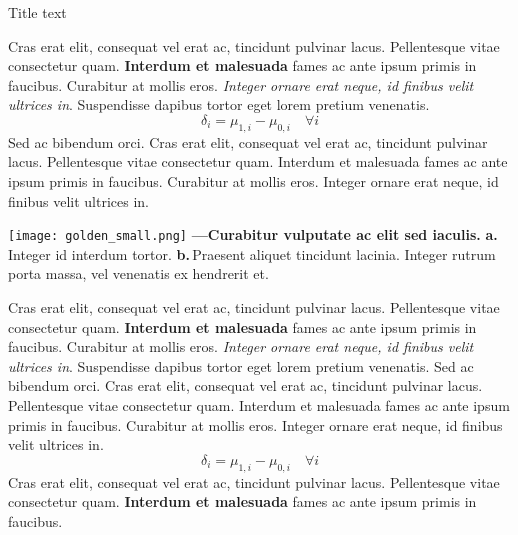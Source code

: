 \documentclass[./main.tex]{subfiles}
\begin{document}
\begin{simplebox}[
    label={mynamelabel},
    nameref={Title or anything else}
    ]{Title text}
    \begin{minipage}[t]{\linewidth}
    Cras erat elit, consequat vel erat ac, tincidunt pulvinar lacus. Pellentesque vitae consectetur quam. \textbf{Interdum et malesuada} fames ac ante ipsum primis in faucibus. Curabitur at mollis eros. \textit{Integer ornare erat neque, id finibus velit ultrices in}. Suspendisse dapibus tortor eget lorem pretium venenatis.
    \begin{equation*} %
    		\label{eq:myeq3}
    		\delta_{i} = \mu_{1, i} - \mu_{0, i} \quad \forall i 
    \end{equation*}
    Sed ac bibendum orci. Cras erat elit, consequat vel erat ac, tincidunt pulvinar lacus. Pellentesque vitae consectetur quam. Interdum et malesuada fames ac ante ipsum primis in faucibus. Curabitur at mollis eros. Integer ornare erat neque, id finibus velit ultrices in.
    \end{minipage}
    \begin{minipage}[t]{\linewidth}
        \begin{minipage}[t]{0.6\linewidth}
        \vspace*{5pt}
        	\texttt{[image: golden\_small.png]}		
        	 {
            	\textbf{---\;Curabitur vulputate ac elit sed iaculis.}
            	\textbf{a.}\,Integer id interdum tortor.
            	\textbf{b.}\,Praesent aliquet tincidunt lacinia. Integer rutrum porta massa, vel venenatis ex hendrerit et. 
        	}
            \label{fig:myfig4}  %
        \vspace*{5pt}
    \end{minipage}
    \end{minipage}
    \begin{minipage}[t]{\linewidth}
    Cras erat elit, consequat vel erat ac, tincidunt pulvinar lacus. Pellentesque vitae consectetur quam. \textbf{Interdum et malesuada} fames ac ante ipsum primis in faucibus. Curabitur at mollis eros. \textit{Integer ornare erat neque, id finibus velit ultrices in}. Suspendisse dapibus tortor eget lorem pretium venenatis.
    Sed ac bibendum orci. Cras erat elit, consequat vel erat ac, tincidunt pulvinar lacus. Pellentesque vitae consectetur quam. Interdum et malesuada fames ac ante ipsum primis in faucibus. Curabitur at mollis eros. Integer ornare erat neque, id finibus velit ultrices in. 
    \begin{equation*} %
    		\label{eq:myeq3453453}
    		\delta_{i} = \mu_{1, i} - \mu_{0, i} \quad \forall i 
    \end{equation*}
    Cras erat elit, consequat vel erat ac, tincidunt pulvinar lacus. Pellentesque vitae consectetur quam. \textbf{Interdum et malesuada} fames ac ante ipsum primis in faucibus. 
    \end{minipage}
\label{box:01}
\end{simplebox}
\end{document}
